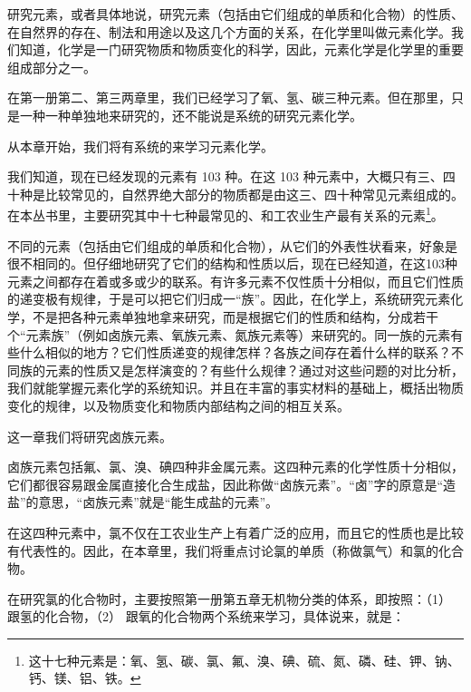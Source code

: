 研究元素，或者具体地说，研究元素（包括由它们组成的单质和化合物）的性质、在自然界的存在、制法和用途以及这几个方面的关系，在化学里叫做元素化学。我们知道，化学是一门研究物质和物质变化的科学，因此，元素化学是化学里的重要组成部分之一。

在第一册第二、第三两章里，我们已经学习了氧、氢、碳三种元素。但在那里，只是一种一种单独地来研究的，还不能说是系统的研究元素化学。

从本章开始，我们将有系统的来学习元素化学。

我们知道，现在已经发现的元素有 103 种。在这 103
种元素中，大概只有三、四十种是比较常见的，自然界绝大部分的物质都是由这三、四十种常见元素组成的。在本丛书里，主要研究其中十七种最常见的、和工农业生产最有关系的元素\footnote{这十七种元素是：氧、氢、碳、氯、氟、溴、碘、硫、氮、磷、硅、钾、钠、钙、镁、铝、铁。}。

不同的元素（包括由它们组成的单质和化合物），从它们的外表性状看来，好象是很不相同的。但仔细地研究了它们的结构和性质以后，现在已经知道，在这103种元素之间都存在着或多或少的联系。有许多元素不仅性质十分相似，而且它们性质的递变极有规律，于是可以把它们归成一``族''。因此，在化学上，系统研究元素化学，不是把各种元素单独地拿来研究，而是根据它们的性质和结构，分成若干个``元素族''（例如卤族元素、氧族元素、氮族元素等）来研究的。同一族的元素有些什么相似的地方？它们性质递变的规律怎样？各族之间存在着什么样的联系？不同族的元素的性质又是怎样演变的？有些什么规律？通过对这些问题的对比分析，我们就能掌握元素化学的系统知识。并且在丰富的事实材料的基础上，概括出物质变化的规律，以及物质变化和物质内部结构之间的相互关系。

这一章我们将研究卤族元素。

卤族元素包括氟、氯、溴、碘四种非金属元素。这四种元素的化学性质十分相似，它们都很容易跟金属直接化合生成盐，因此称做``卤族元素''。``卤''字的原意是``造盐''的意思，``卤族元素''就是``能生成盐的元素''。

在这四种元素中，氯不仅在工农业生产上有着广泛的应用，而且它的性质也是比较有代表性的。因此，在本章里，我们将重点讨论氯的单质（称做氯气）和氯的化合物。

在研究氯的化合物时，主要按照第一册第五章无机物分类的体系，即按照：（1）
跟氢的化合物，（2） 跟氧的化合物两个系统来学习，具体说来，就是：

